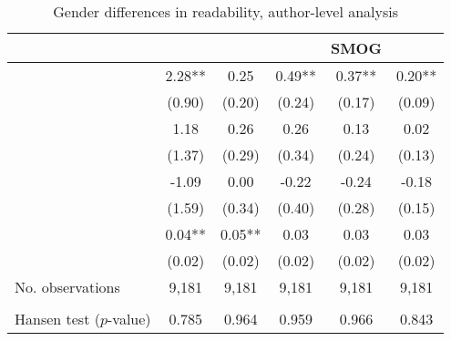 \begin{table}
    \footnotesize
    \centering
    \begin{threeparttable}
        \caption{Gender differences in readability, author-level analysis}
        \label{table4_FemRatio}
        \begin{tabular}{p{4cm}S@{}S@{}S@{}S@{}S@{}}
            \toprule
            &{}&{}&{}&{SMOG}&{}\\
            \midrule
            &        2.28** &        0.25   &        0.49** &        0.37** &        0.20** \\
                                          &      (0.90)   &      (0.20)   &      (0.24)   &      (0.17)   &      (0.09)   \\
            &        1.18   &        0.26   &        0.26   &        0.13   &        0.02   \\
                                          &      (1.37)   &      (0.29)   &      (0.34)   &      (0.24)   &      (0.13)   \\
            &       -1.09   &        0.00   &       -0.22   &       -0.24   &       -0.18   \\
                                          &      (1.59)   &      (0.34)   &      (0.40)   &      (0.28)   &      (0.15)   \\
            &        0.04** &        0.05** &        0.03   &        0.03   &        0.03   \\
                                          &      (0.02)   &      (0.02)   &      (0.02)   &      (0.02)   &      (0.02)   \\
            \midrule
            No. observations     &       9,181   &       9,181   &       9,181   &       9,181   &       9,181   \\
             \\
            \quad Hansen test (\(p\)-value)&       0.785   &       0.964   &       0.959   &       0.966   &       0.843   \\

\end{tabular}
\end{threeparttable}
\end{table}
